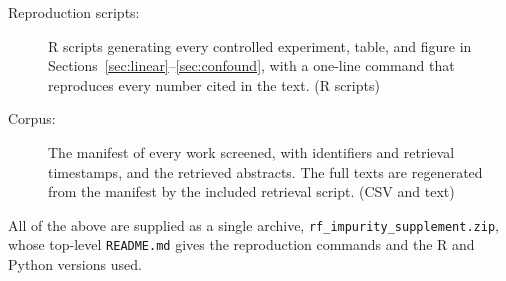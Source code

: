 \documentclass[12pt]{article}
\newcommand{\code}[1]{\texttt{#1}}
\begin{document}
\begin{description}
\item[Reproduction scripts:]
R scripts generating every controlled experiment, table, and figure in
Sections~\ref{sec:linear}--\ref{sec:confound}, with a one-line command that
reproduces every number cited in the text. (R scripts)
\item[Corpus:]
The manifest of every work screened, with identifiers and retrieval
timestamps, and the retrieved abstracts. The full texts are regenerated from
the manifest by the included retrieval script. (CSV and text)
\end{description}

All of the above are supplied as a single archive,
\code{rf\_impurity\_supplement.zip}, whose top-level \code{README.md} gives the
reproduction commands and the R and Python versions used.

\appendix



\end{document}
